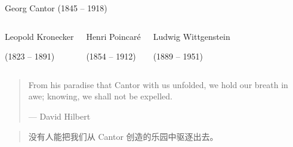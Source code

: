 
\begin{frame}{}
  \begin{columns}
      \vspace{-0.20cm}
      {\centerline{\footnotesize Georg Cantor (1845 -- 1918)}}
  \end{columns}

  \begin{columns}
    \pause
      \vspace{-0.50cm}
      \begin{center}
	{\footnotesize Leopold Kronecker}
      
        {\footnotesize (1823 -- 1891)}
      \end{center}
    \pause
      \vspace{-0.50cm}
      \begin{center}
	{\footnotesize Henri Poincar\'{e}}
      
        {\footnotesize (1854 -- 1912)}
      \end{center}
    \pause
      \vspace{-0.50cm}
      \begin{center}
	{\footnotesize Ludwig Wittgenstein}
      
        {\footnotesize (1889 -- 1951)}
      \end{center}
  \end{columns}
\end{frame}

\begin{frame}{}
  \begin{quote}
    From his paradise that Cantor with us unfolded, 
    we hold our breath in awe; knowing, we shall not be expelled.

    \hfill --- David Hilbert
  \end{quote}

  \vspace{0.80cm}
  \begin{quote}
    \centerline{没有人能把我们从 Cantor 创造的乐园中驱逐出去。}
  \end{quote}

  \pause
\end{frame}

